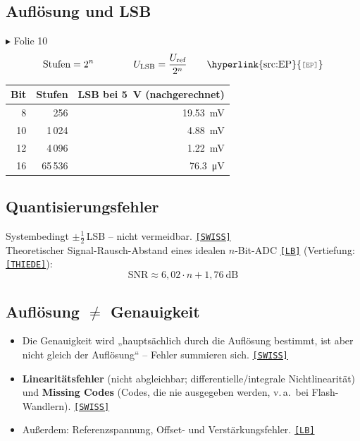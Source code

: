 \documentclass[11pt,a4paper]{article}
\newcommand{\q}[1]{\hyperlink{src:#1}{\textcolor{quelle}{\texttt{\footnotesize[#1]}}}}
\newcommand{\folie}[1]{\textcolor{akzent}{\footnotesize\textsf{$\blacktriangleright$ Folie #1}}}
\begin{document}
\subsection{Auflösung und LSB}\label{sec:lsb}
\folie{10}
\begin{equation}\label{f:lsb}
\text{Stufen}=2^n\qquad\qquad U_\text{LSB}=\frac{U_\text{ref}}{2^n}\qquad\text{\q{EP}}
\end{equation}
\begin{center}
\begin{tabular}{rrr}
\toprule
Bit & Stufen & LSB bei \SI{5}{\volt} (nachgerechnet)\\ \midrule
8 & 256 & \SI{19.53}{\milli\volt}\\
10 & 1\,024 & \SI{4.88}{\milli\volt}\\
12 & 4\,096 & \SI{1.22}{\milli\volt}\\
16 & 65\,536 & \SI{76.3}{\micro\volt}\\
\bottomrule
\end{tabular}
\end{center}

\subsection{Quantisierungsfehler}\label{sec:qfehler}
Systembedingt $\pm\frac12$\,LSB -- nicht vermeidbar. \q{SWISS}\\
Theoretischer Signal-Rausch-Abstand eines idealen $n$-Bit-ADC \q{LB} (Vertiefung: \q{THIEDE}):
\begin{equation}\label{f:snr}
\text{SNR}\approx 6{,}02\cdot n+1{,}76\ \text{dB}
\end{equation}

\subsection{Auflösung \texorpdfstring{$\neq$}{≠} Genauigkeit}\label{sec:genau}
\begin{itemize}
  \item Die Genauigkeit wird „hauptsächlich durch die Auflösung bestimmt, ist aber nicht gleich der Auflösung“ -- Fehler summieren sich. \q{SWISS}
  \item \textbf{Linearitätsfehler} (nicht abgleichbar; differentielle/integrale Nichtlinearität) und \textbf{Missing Codes} (Codes, die nie ausgegeben werden, v.\,a.\ bei Flash-Wandlern). \q{SWISS}
  \item Außerdem: Referenzspannung, Offset- und Verstärkungsfehler. \q{LB}
\end{itemize}
\end{document}
